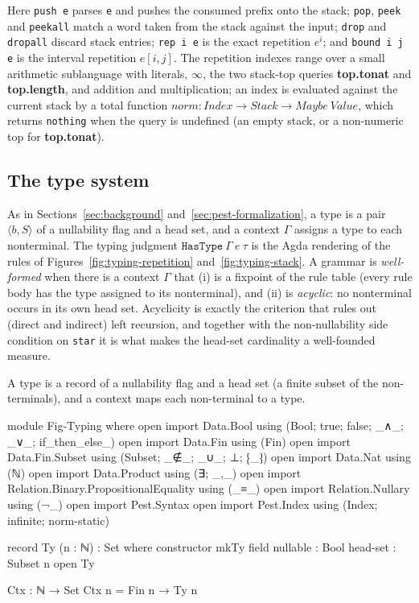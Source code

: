 \documentclass[preprint,12pt]{elsarticle}
\theoremstyle{definition}
\begin{document}
Here \lstinline{push e} parses \lstinline{e} and pushes the consumed prefix onto
the stack; \lstinline{pop}, \lstinline{peek} and \lstinline{peekall} match a
word taken from the stack against the input; \lstinline{drop} and
\lstinline{dropall} discard stack entries; \lstinline{rep i e} is the exact
repetition $e^{i}$; and \lstinline{bound i j e} is the interval repetition
$e[i,j]$. The repetition indexes range over a small arithmetic sublanguage with
literals, $\infty$, the two stack-top queries \textbf{top.tonat} and
\textbf{top.length}, and addition and multiplication; an index is evaluated
against the current stack by a total function
$\mathit{norm} : \mathit{Index} \to \mathit{Stack} \to \mathit{Maybe}\ \mathit{Value}$,
which returns \lstinline{nothing} when the query is undefined (an empty stack, or
a non-numeric top for \textbf{top.tonat}).

\subsection{The type system}\label{sec:agda-typing}

As in Sections~\ref{sec:background} and~\ref{sec:pest-formalization}, a type is a
pair $\langle b, S\rangle$ of a nullability flag and a head set, and a context
$\Gamma$ assigns a type to each nonterminal. The typing judgment
$\mathtt{HasType}\ \Gamma\ e\ \tau$ is the Agda rendering of the rules of
Figures~\ref{fig:typing-repetition} and~\ref{fig:typing-stack}. A grammar is
\emph{well-formed} when there is a context $\Gamma$ that (i) is a fixpoint of the
rule table (every rule body has the type assigned to its nonterminal), and
(ii) is \emph{acyclic}: no nonterminal occurs in its own head set. Acyclicity is
exactly the criterion that rules out (direct and indirect) left recursion, and
together with the non-nullability side condition on \lstinline{star} it is what
makes the head-set cardinality a well-founded measure.

A type is a record of a nullability flag and a head set (a finite subset of the
non-terminals), and a context maps each non-terminal to a type. 
\begin{code}[hide]
module Fig-Typing where
  open import Data.Bool using (Bool; true; false; _∧_; _∨_; if_then_else_)
  open import Data.Fin using (Fin)
  open import Data.Fin.Subset using (Subset; _∉_; _∪_; ⊥; ⁅_⁆)
  open import Data.Nat using (ℕ)
  open import Data.Product using (∃; _,_)
  open import Relation.Binary.PropositionalEquality using (_≡_)
  open import Relation.Nullary using (¬_)
  open import Pest.Syntax
  open import Pest.Index using (Index; infinite; norm-static)
\end{code}
\begin{code}
  record Ty (n : ℕ) : Set where
    constructor mkTy
    field nullable : Bool
          head-set : Subset n
  open Ty

  Ctx : ℕ → Set
  Ctx n = Fin n → Ty n
\end{code}
\end{document}
